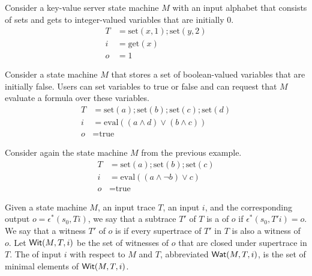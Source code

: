 \begin{example}
  \newcommand{\kvset}{\text{set}}
  \newcommand{\kvget}{\text{get}}
  Consider a key-value server state machine $M$ with an input alphabet that
  consists of sets and gets to integer-valued variables that are initially $0$.
  \begin{align*}
    T &= \kvset(x, 1); \kvset(y, 2) \\
    i &= \kvget(x) \\
    o &= 1
  \end{align*}
\end{example}

\begin{example}
  \newcommand{\Mset}{\text{set}}
  \newcommand{\Meval}{\text{eval}}
  Consider a state machine $M$ that stores a set of boolean-valued variables
  that are initially false. Users can set variables to true or false and can
  request that $M$ evaluate a formula over these variables.
  \begin{align*}
    T &= \Mset(a); \Mset(b); \Mset(c); \Mset(d) \\
    i &= \Meval((a \land d) \lor (b \land c)) \\
    o &= \text{true}
  \end{align*}
\end{example}

\begin{example}
  \newcommand{\Mset}{\text{set}}
  \newcommand{\Meval}{\text{eval}}
  Consider again the state machine $M$ from the previous example.
  \begin{align*}
    T &= \Mset(a); \Mset(b); \Mset(c) \\
    i &= \Meval((a \land \lnot b) \lor c) \\
    o &= \text{true}
  \end{align*}
\end{example}

Given a state machine $M$, an input
trace $T$, an input $i$, and the corresponding output $o = \epsilon^*(s_0,
Ti)$, we say that a subtrace $T'$ of $T$ is a  of $o$ if
$\epsilon^*(s_0, T'i) = o$. We say that a witness $T'$ of $o$ is
 if every supertrace of $T'$ in $T$ is
also a witness of $o$. Let $\textsf{Wit}(M, T, i)$ be the set of witnesses of $o$ that
are closed under supertrace in $T$. The  of input $i$
with respect to $M$ and $T$, abbreviated $\textsf{Wat}(M, T, i)$, is the set of minimal
elements of $\textsf{Wit}(M, T, i)$.

